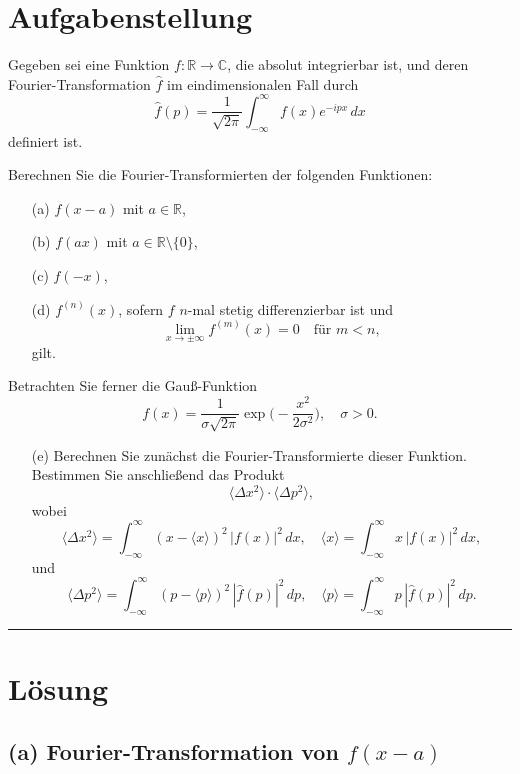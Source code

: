 \documentclass[a4paper,12pt]{article}
\begin{document}
\section*{Aufgabenstellung}

Gegeben sei eine Funktion \( f : \mathbb{R} \to \mathbb{C} \), die absolut integrierbar ist, und deren Fourier-Transformation \(\hat{f}\) im eindimensionalen Fall durch
\[
\hat{f}(p)=\frac{1}{\sqrt{2\pi}}\int_{-\infty}^{\infty} f(x)e^{-ipx}\,dx
\]
definiert ist.

Berechnen Sie die Fourier-Transformierten der folgenden Funktionen:
\begin{enumerate}
  \item[(a)] \( f(x-a) \) mit \( a\in\mathbb{R} \),
  \item[(b)] \( f(ax) \) mit \( a\in\mathbb{R}\setminus\{0\} \),
  \item[(c)] \( f(-x) \),
  \item[(d)] \( f^{(n)}(x) \), sofern \( f \) \( n \)-mal stetig differenzierbar ist und 
  \[
  \lim_{x\to\pm\infty} f^{(m)}(x)=0 \quad \text{für } m<n,
  \]
  gilt.
\end{enumerate}

Betrachten Sie ferner die Gauß-Funktion
\[
f(x)=\frac{1}{\sigma\sqrt{2\pi}}\exp\!\Biggl(-\frac{x^2}{2\sigma^2}\Biggr),\quad \sigma>0.
\]
\begin{enumerate}
  \item[(e)] Berechnen Sie zunächst die Fourier-Transformierte dieser Funktion. Bestimmen Sie anschließend das Produkt
  \[
  \langle \Delta x^2 \rangle \cdot \langle \Delta p^2 \rangle,
  \]
  wobei
  \[
  \langle \Delta x^2 \rangle = \int_{-\infty}^{\infty} (x-\langle x\rangle)^2\, |f(x)|^2\,dx,\quad \langle x\rangle =\int_{-\infty}^{\infty} x\, |f(x)|^2\,dx,
  \]
  und
  \[
  \langle \Delta p^2 \rangle = \int_{-\infty}^{\infty} (p-\langle p\rangle)^2\, |\hat{f}(p)|^2\,dp,\quad \langle p\rangle =\int_{-\infty}^{\infty} p\, |\hat{f}(p)|^2\,dp.
  \]
\end{enumerate}

\vspace{5mm}
\hrule
\vspace{5mm}

\section*{Lösung}

\subsection*{(a) Fourier-Transformation von \( f(x-a) \)}
\end{document}
